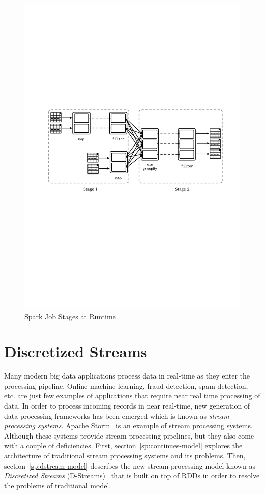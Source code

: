 \begin{figure}[h!]
    \includegraphics[clip,trim=2.3cm 11.4cm 1.7cm 10cm,scale=0.97]{stage-dag.pdf}
    \caption{Spark Job Stages at Runtime}
    \label{fig:sp:dag}
\end{figure}

\clearpage
\section{Discretized Streams}
\label{sp:dstream}

Many modern big data applications process data in real-time as they enter the processing pipeline. Online machine learning, fraud detection, spam detection, etc. are just few examples of applications that require near real time processing of data. In order to process incoming records in near real-time, new generation of data processing frameworks has been emerged which is known as \emph{stream processing systems}. Apache Storm~\cite{Storm} is an example of stream processing systems. Although these systems provide stream processing pipelines, but they also come with a couple of deficiencies. First, section~\ref{sp:continues-model} explores the architecture of traditional stream processing systems and its problems. Then, section~\ref{sp:dstream-model} describes the new stream processing model known as \emph{Discretized Streams} (D-Streams)~\cite{Zaharia:2013} that is built on top of RDDs in order to resolve the problems of traditional model.

